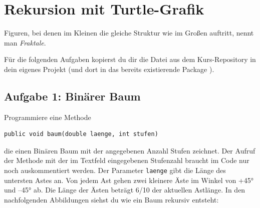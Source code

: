 \section{Rekursion mit Turtle-Grafik}

Figuren, bei denen im Kleinen die gleiche Struktur wie im Großen auftritt,
nennt man \emph{Fraktale}.

Für die folgenden Aufgaben kopierst du dir die Datei
 aus dem Kurs-Repository in dein eigenes Projekt (und
dort in das bereits existierende Package ).

\subsection{Aufgabe 1: Binärer Baum}

Programmiere eine Methode

\begin{lstlisting}
public void baum(double laenge, int stufen)
\end{lstlisting}

die einen Binären Baum mit der angegebenen Anzahl Stufen zeichnet. Der Aufruf
der Methode mit der im Textfeld eingegebenen Stufenzahl braucht im Code nur
noch auskommentiert werden. Der Parameter \lstinline|laenge| gibt die Länge des
untersten Astes an. Von jedem Ast gehen zwei kleinere Äste im Winkel von +45°
und –45° ab. Die Länge der Ästen beträgt 6/10 der aktuellen Astlänge. In den
nachfolgenden Abbildungen siehst du wie ein Baum rekursiv entsteht:


